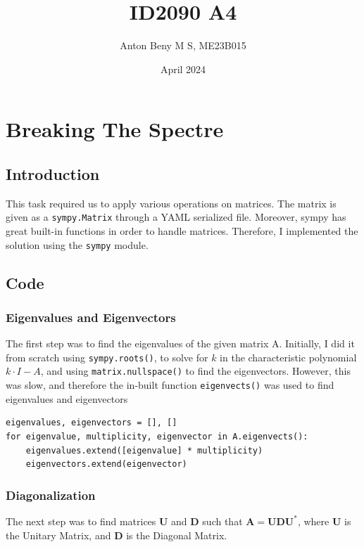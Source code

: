 \documentclass{report}
\title{ID2090 A4}
\author{Anton Beny M S, ME23B015}
\date{April 2024}
\begin{document}
\maketitle
\newpage

\tableofcontents

\newpage

\chapter{Breaking The Spectre}

\section{Introduction}
This task required us to apply various operations on matrices. The matrix is given as a \texttt{sympy.Matrix} through a YAML serialized file. Moreover, sympy has great built-in functions in order to handle matrices. Therefore, I implemented the solution using the \texttt{sympy} module.

\section{Code}

\subsection{Eigenvalues and Eigenvectors}
The first step was to find the eigenvalues of the given matrix A. Initially, I did it from scratch using \texttt{sympy.roots()}, to solve for $k$ in the characteristic polynomial $k\cdot I - A$, and using \texttt{matrix.nullspace()} to find the eigenvectors. However, this was slow, and therefore the in-built function \texttt{eigenvects()} was used to find eigenvalues and eigenvectors
\newline

\begin{lstlisting}
eigenvalues, eigenvectors = [], []
for eigenvalue, multiplicity, eigenvector in A.eigenvects():
    eigenvalues.extend([eigenvalue] * multiplicity)
    eigenvectors.extend(eigenvector)
\end{lstlisting}

\subsection{Diagonalization}
The next step was to find matrices $\boldsymbol{U}$ and $\boldsymbol{D}$ such that $\boldsymbol{A}=\boldsymbol{U}\boldsymbol{D}\boldsymbol{U}^*$, where $\boldsymbol{U}$ is the Unitary Matrix, and $\boldsymbol{D}$ is the Diagonal Matrix.
\newline
\end{document}
